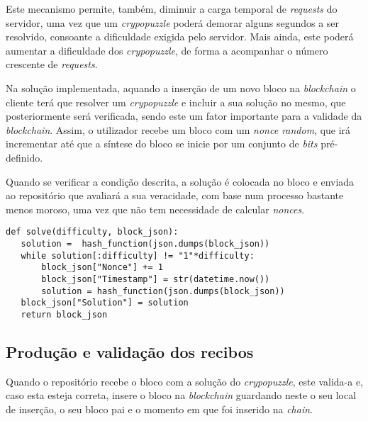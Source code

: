 \documentclass[12pt]{article}
\begin{document}
\par Este mecanismo permite, também, diminuir a carga temporal de \textit{requests} do servidor, uma vez que um \textit{crypopuzzle} poderá demorar alguns segundos a ser resolvido, consoante a dificuldade exigida pelo servidor. Mais ainda, este poderá aumentar a dificuldade dos \textit{crypopuzzle}, de forma a acompanhar o número crescente de \textit{requests}.

\par Na solução implementada, aquando a inserção de um novo bloco na \textit{blockchain} o cliente terá que resolver um \textit{crypopuzzle} e incluir a sua solução no mesmo, que posteriormente será verificada, sendo este um fator importante para a validade da \textit{blockchain}. Assim, o utilizador recebe um bloco com um \textit{nonce random}, que irá incrementar até que a síntese do bloco se inicie por um conjunto de \textit{bits} pré-definido.

\par Quando se verificar a condição descrita, a solução é colocada no bloco e enviada ao repositório que avaliará a sua veracidade, com base num processo bastante menos moroso, uma vez que não tem necessidade de calcular \textit{nonces}. 

\vspace{5mm} %

\begin{lstlisting}[caption={Função Utilizada Para Resolver um \textit{Cryptopuzzle}},captionpos=b]
def solve(difficulty, block_json):
   solution =  hash_function(json.dumps(block_json))
   while solution[:difficulty] != "1"*difficulty:
       block_json["Nonce"] += 1
       block_json["Timestamp"] = str(datetime.now())
       solution = hash_function(json.dumps(block_json))
   block_json["Solution"] = solution
   return block_json
\end{lstlisting}






\subsection{Produção e validação dos recibos}

\par Quando o repositório recebe o bloco com a solução do \textit{crypopuzzle}, este valida-a e, caso esta esteja correta, insere o bloco na \textit{blockchain} guardando neste o seu local de inserção, o seu bloco pai e o momento em que foi inserido na \textit{chain}.
\end{document}

